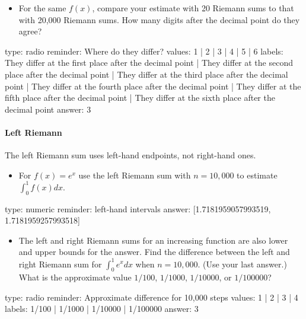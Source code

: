 \documentclass[12pt]{article}
\begin{document}
\begin{itemize}
\itemsep1pt\parskip0pt
\item
  For the same $f(x)$, compare your estimate with 20 Riemann sums to
  that with 20,000 Riemann sums. How many digits after the decimal point
  do they agree?
\end{itemize}

\begin{answer}
type: radio
reminder: Where do they differ?
values: 1 | 2 | 3 | 4 | 5 | 6
labels: They differ at the first place after the decimal point | They differ at the second place after the decimal point | They differ at the third place after the decimal point | They differ at the fourth place after the decimal point | They differ at the fifth place after the decimal point | They differ at the sixth place after the decimal point
answer: 3
\end{answer}

\paragraph{Left Riemann}

The left Riemann sum uses left-hand endpoints, not right-hand ones.

\begin{itemize}
\itemsep1pt\parskip0pt
\item
  For $f(x) = e^{x}$ use the left Riemann sum with $n=10,000$ to
  estimate $\int_0^1 f(x) dx$.
\end{itemize}

\begin{answer}
    type: numeric
    reminder: left-hand intervals
    answer: [1.7181959057993519, 1.7181959257993518]

\end{answer}

\begin{itemize}
\itemsep1pt\parskip0pt
\item
  The left and right Riemann sums for an increasing function are also
  lower and upper bounds for the answer. Find the difference between the
  left and right Riemann sum for $\int_0^1 e^x dx$ when $n=10,000$. (Use
  your last answer.) What is the approximate value $1/100$, $1/1000$,
  $1/10000$, or $1/100000$?
\end{itemize}

\begin{answer}
type: radio
reminder: Approximate difference for 10,000 steps
values: 1 | 2 | 3 | 4
labels: 1/100 | 1/1000 | 1/10000 | 1/100000
answer: 3
\end{answer}
\end{document}
